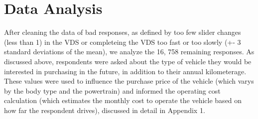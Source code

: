 \documentclass[]{elsarticle} %
\begin{document}
\section{Data Analysis}\label{data-analysis}

After cleaning the data of bad responses, as defined by too few slider
changes (less than 1) in the VDS or completeing the VDS too fast or too
slowly (+- 3 standard deviations of the mean), we analyze the 16, 758
remaining responses. As discussed above, respondents were asked about
the type of vehicle they would be interested in purchasing in the
future, in addition to their annual kilometerage. These values were used
to influence the purchase price of the vehicle (which varys by the body
type and the powertrain) and informed the operating cost calculation
(which estimates the monthly cost to operate the vehicle based on how
far the respondent drives), discussed in detail in Appendix 1.
\end{document}
